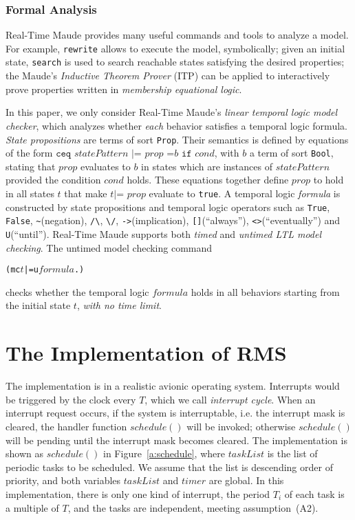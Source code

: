 \documentclass[10pt,journal,compsoc]{IEEEtran}
\begin{document}
\subsubsection{Formal Analysis}
Real-Time Maude provides many useful commands and tools to analyze a
model. For example, \verb|rewrite| allows to execute the model,
symbolically; given an initial state, \verb|search| is used to search
reachable states satisfying the desired properties; the Maude's
\emph{Inductive Theorem Prover} (ITP) can be applied to interactively
prove properties written in \emph{membership equational logic}. 

In this paper, we only consider Real-Time Maude's \emph{linear
  temporal logic model checker}, which analyzes whether \emph{each}
behavior satisfies a temporal logic formula. \emph{State propositions}
are terms of sort \verb|Prop|. Their semantics is defined by equations
of the form $\texttt{ceq } statePattern \texttt{ |= } prop \texttt{ =
} b \texttt{ if } cond$, with $b$ a term of sort \verb|Bool|, stating
that $prop$ evaluates to $b$ in states which are instances of
$statePattern$ provided the condition $cond$ holds. These equations
together define $prop$ to hold in all states $t$ that make $t \texttt{
  |= } prop$ evaluate to \verb|true|. A temporal logic \emph{formula}
is constructed by state propositions and temporal logic operators such
as \verb|True|, \verb|False|, \verb|~|(negation), \verb|/\|,
\verb|\/|, \verb|->|(implication), \verb|[]|(``always''),
\verb|<>|(``eventually'') and \verb|U|(``until''). Real-Time Maude
supports both \emph{timed} and \emph{untimed LTL model checking}. The
untimed model checking command
\begin{alltt}
  (mc \(t\) |=u \(formula\) .)
\end{alltt}
checks whether the temporal logic $formula$ holds in all behaviors
starting from the initial state $t$, \emph{with no time limit}.


\section{The Implementation of RMS}
\label{s:imp}
The implementation is in a realistic avionic operating system.
Interrupts would be triggered by the clock every $T$, which we call
\emph{interrupt cycle}. When an interrupt request occurs, if the
system is interruptable, i.e. the interrupt mask is cleared, the
handler function $schedule()$ will be invoked; otherwise $schedule()$
will be pending until the interrupt mask becomes cleared.  The
implementation is shown as $schedule()$ in Figure~\ref{a:schedule},
where $taskList$ is the list of periodic tasks to be scheduled. We
assume that the list is descending order of priority, and both
variables $taskList$ and $timer$ are global. In this implementation,
there is only one kind of interrupt, the period $T_i$ of each task is
a multiple of $T$, and the tasks are independent, meeting
assumption~(A2).
\end{document}
